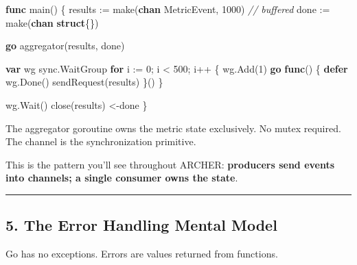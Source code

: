 \documentclass[
]{article}
\newenvironment{Shaded}{}{}
\newcommand{\BuiltInTok}[1]{\textcolor[rgb]{0.00,0.50,0.00}{#1}}
\newcommand{\CommentTok}[1]{\textcolor[rgb]{0.38,0.63,0.69}{\textit{#1}}}
\newcommand{\ControlFlowTok}[1]{\textcolor[rgb]{0.00,0.44,0.13}{\textbf{#1}}}
\newcommand{\DecValTok}[1]{\textcolor[rgb]{0.25,0.63,0.44}{#1}}
\newcommand{\KeywordTok}[1]{\textcolor[rgb]{0.00,0.44,0.13}{\textbf{#1}}}
\newcommand{\NormalTok}[1]{#1}
\newcommand{\OperatorTok}[1]{\textcolor[rgb]{0.40,0.40,0.40}{#1}}
\begin{document}
\begin{Shaded}
\begin{Highlighting}[]
\KeywordTok{func}\NormalTok{ main}\OperatorTok{()} \OperatorTok{\{}
\NormalTok{    results }\OperatorTok{:=} \BuiltInTok{make}\OperatorTok{(}\KeywordTok{chan}\NormalTok{ MetricEvent}\OperatorTok{,} \DecValTok{1000}\OperatorTok{)} \CommentTok{// buffered}
\NormalTok{    done }\OperatorTok{:=} \BuiltInTok{make}\OperatorTok{(}\KeywordTok{chan} \KeywordTok{struct}\OperatorTok{\{\})}

    \ControlFlowTok{go}\NormalTok{ aggregator}\OperatorTok{(}\NormalTok{results}\OperatorTok{,}\NormalTok{ done}\OperatorTok{)}

    \KeywordTok{var}\NormalTok{ wg sync}\OperatorTok{.}\NormalTok{WaitGroup}
    \ControlFlowTok{for}\NormalTok{ i }\OperatorTok{:=} \DecValTok{0}\OperatorTok{;}\NormalTok{ i }\OperatorTok{\textless{}} \DecValTok{500}\OperatorTok{;}\NormalTok{ i}\OperatorTok{++} \OperatorTok{\{}
\NormalTok{        wg}\OperatorTok{.}\NormalTok{Add}\OperatorTok{(}\DecValTok{1}\OperatorTok{)}
        \ControlFlowTok{go} \KeywordTok{func}\OperatorTok{()} \OperatorTok{\{}
            \ControlFlowTok{defer}\NormalTok{ wg}\OperatorTok{.}\NormalTok{Done}\OperatorTok{()}
\NormalTok{            sendRequest}\OperatorTok{(}\NormalTok{results}\OperatorTok{)}
        \OperatorTok{\}()}
    \OperatorTok{\}}

\NormalTok{    wg}\OperatorTok{.}\NormalTok{Wait}\OperatorTok{()}
    \BuiltInTok{close}\OperatorTok{(}\NormalTok{results}\OperatorTok{)}
    \OperatorTok{\textless{}{-}}\NormalTok{done}
\OperatorTok{\}}
\end{Highlighting}
\end{Shaded}

The aggregator goroutine owns the metric state exclusively. No mutex
required. The channel is the synchronization primitive.

This is the pattern you'll see throughout ARCHER: \textbf{producers send
events into channels; a single consumer owns the state}.

\begin{center}\rule{0.5\linewidth}{0.5pt}\end{center}

\hypertarget{the-error-handling-mental-model}{%
\subsection{5. The Error Handling Mental
Model}\label{the-error-handling-mental-model}}

Go has no exceptions. Errors are values returned from functions.
\end{document}
